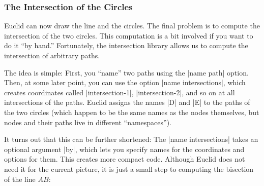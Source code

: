 \subsubsection{The Intersection of the Circles}

Euclid can now draw the line and the circles. The final problem is to
compute the intersection of the two circles. This computation is a bit
involved if you want to do it ``by hand.'' Fortunately, the
intersection library allows us to compute the intersection of
arbitrary paths.

The idea is simple: First, you ``name'' two paths using the
|name path| option. Then, at some later point, you can use the option
|name intersections|, which creates coordinates called
|intersection-1|, |intersection-2|, and so on at all intersections of
the paths. Euclid assigns the names |D| and |E| to the paths of the
two circles (which happen to be the same names as the nodes
themselves, but nodes and their paths live in different
``namespaces''). 
\begin{codeexample}[]
\end{codeexample}

It turns out that this can be further shortened: The
|name intersections| takes an optional argument |by|, which lets you
specify names for the coordinates and options for them. This creates
more compact code. Although Euclid does not need it for the current
picture, it is just a small step to computing the bisection of the line $AB$:

\begin{codeexample}[]
\end{codeexample}



